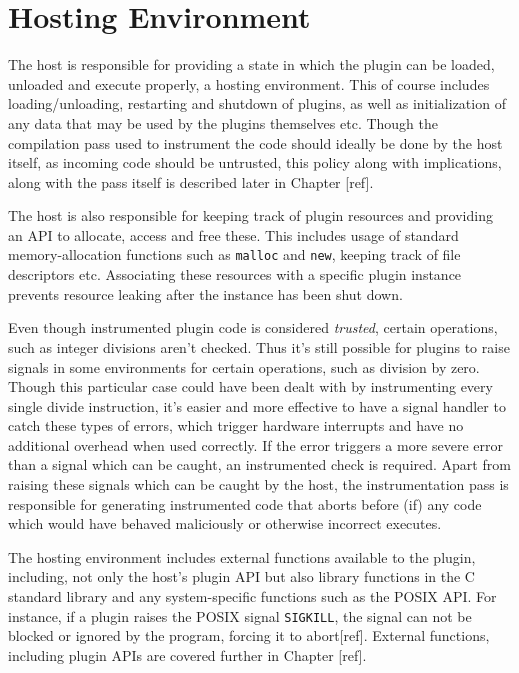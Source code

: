 \chapter {Hosting Environment}

The host is responsible for providing a state in which the plugin can be loaded,
unloaded and execute properly, a hosting environment.
This of course includes loading/unloading, restarting and shutdown of plugins,
as well as initialization of any data that may be used by the plugins themselves
etc.
Though the compilation pass used to instrument the code should ideally be done
by the host itself, as incoming code should be untrusted, this policy along with
implications, along with the pass itself is described later in Chapter [ref].

The host is also responsible for keeping track of plugin resources and providing
an API to allocate, access and free these.
This includes usage of standard memory-allocation functions such as
\texttt{malloc} and \texttt{new}, keeping track of file descriptors etc.
Associating these resources with a specific plugin instance prevents resource
leaking after the instance has been shut down.

Even though instrumented plugin code is considered \emph{trusted}, certain
operations, such as integer divisions aren't checked.
Thus it's still possible for plugins to raise signals in some environments for
certain operations, such as division by zero.
Though this particular case could have been dealt with by instrumenting every
single divide instruction, it's easier and more effective to have a signal
handler to catch these types of errors, which trigger hardware interrupts and
have no additional overhead when used correctly.
If the error triggers a more severe error than a signal which can be caught, an
instrumented check is required. Apart from raising these signals which can be
caught by the host, the instrumentation pass is responsible for generating
instrumented code that aborts before (if) any code which would have behaved
maliciously or otherwise incorrect executes.

The hosting environment includes external functions available to the plugin,
including, not only the host's plugin API but also library functions in the C
standard library and any system-specific functions such as the POSIX API.
For instance, if a plugin raises the POSIX signal \texttt{SIGKILL}, the signal
can not be blocked or ignored by the program, forcing it to abort[ref]. External
functions, including plugin APIs are covered further in Chapter [ref].

